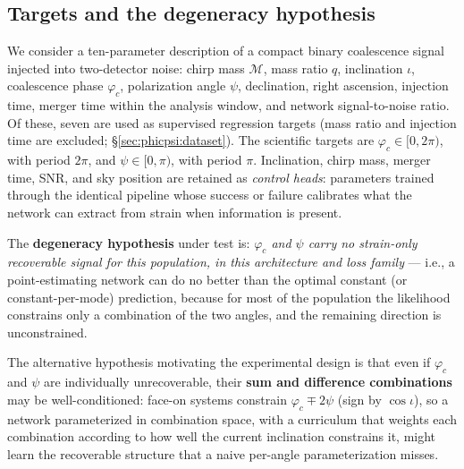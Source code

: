 \subsection{Targets and the degeneracy hypothesis}
\label{subsec:targets-and-the-degeneracy-hypothesis}

We consider a ten-parameter description of a compact binary coalescence signal injected into two-detector noise: chirp mass $\mathcal{M}$, mass ratio $q$, inclination $\iota$, coalescence phase $\varphi_c$, polarization angle $\psi$, declination, right ascension, injection time, merger time within the analysis window, and network signal-to-noise ratio.
Of these, seven are used as supervised regression targets (mass ratio and injection time are excluded; \S\ref{sec:phicpsi:dataset}).
The scientific targets are $\varphi_c \in [0, 2\pi)$, with period $2\pi$, and $\psi \in [0, \pi)$, with period $\pi$.
Inclination, chirp mass, merger time, SNR, and sky position are retained as \emph{control heads}: parameters trained through the identical pipeline whose success or failure calibrates what the network can extract from strain when information is present.

The \textbf{degeneracy hypothesis} under test is: \emph{$\varphi_c$ and $\psi$ carry no strain-only recoverable signal for this population, in this architecture and loss family} --- i.e., a point-estimating network can do no better than the optimal constant (or constant-per-mode) prediction, because for most of the population the likelihood constrains only a combination of the two angles, and the remaining direction is unconstrained.

The alternative hypothesis motivating the experimental design is that even if $\varphi_c$ and $\psi$ are individually unrecoverable, their \textbf{sum and difference combinations} may be well-conditioned: face-on systems constrain $\varphi_c \mp 2\psi$ (sign by $\cos\iota$), so a network parameterized in combination space, with a curriculum that weights each combination according to how well the current inclination constrains it, might learn the recoverable structure that a naive per-angle parameterization misses.

